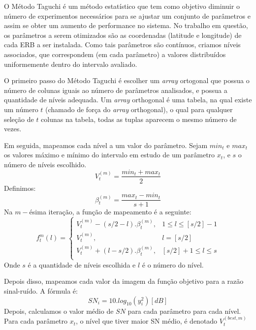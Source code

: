 \documentclass[]{politex}
\begin{document}
O Método Taguchi é um método estatístico que tem como objetivo diminuir o número
de experimentos necessários para se ajustar um conjunto de parâmetros e assim
se obter um aumento de performance no sistema. No trabalho em questão, os
parâmetros a serem otimizados são as coordenadas (latitude e longitude) de cada
ERB a ser instalada. Como tais parâmetros são contínuos, criamos níveis
associados, que correspondem (em cada parâmetro) a valores distribuídos
uniformemente dentro do intervalo avaliado.

O primeiro passo do Método Taguchi é escolher um \textit{array} ortogonal que possua o
número de colunas iguais ao número de parâmetros analisados, e possua a
quantidade de níveis adequada. Um \textit{array} orthogonal é uma tabela, na qual existe um
número $t$ (chamado de força do \textit{array} orthogonal), o qual para qualquer seleção de
$t$ colunas na tabela, todas as tuplas aparecem o mesmo número de vezes.

Em seguida, mapeamos cada nível a um valor do parâmetro. Sejam $min_t$ e $max_t$
os valores máximo e mínimo do intervalo em estudo de um parâmetro $x_t$, e $s$ o
número de níveis escolhido.
\begin{equation*}
    V_t^{(m)}=\frac{min_t+max_t}{2}
\end{equation*}
Definimos:
\begin{equation*}
    \beta_t^{(m)} = \frac{max_t-min_t}{s+1}
\end{equation*}
Na $m-$ésima iteração, a função de mapeamento é a seguinte:
\begin{equation*}
    f_t^m(l) =
    \begin{cases}
        V_t^{(m)} - (s/2 - l).\beta_t^{(m)}, & 1 \leq l \leq [s/2] - 1 \\
        V_t^{(m)}, &  l = [s/2]\\
        V_t^{(m)} + (l - s/2).\beta_t^{(m)}, & [s/2] + 1 \leq l \leq s \\
    \end{cases}
\end{equation*}
Onde $s$ é a quantidade de níveis escolhida e $l$ é o número do nível.

Depois disso, mapeamos cada valor da imagem da função objetivo para a razão
sinal-ruído. A fórmula é:
\begin{equation*}
    SN_i = 10.log_{10}(y_i^2) [dB]
\end{equation*}
Depois, calculamos o valor médio de $SN$ para cada parâmetro para cada nível.
Para cada parâmetro $x_t$, o nível que tiver maior SN médio, é denotado
$V_t^{(best, m)}$
\end{document}
